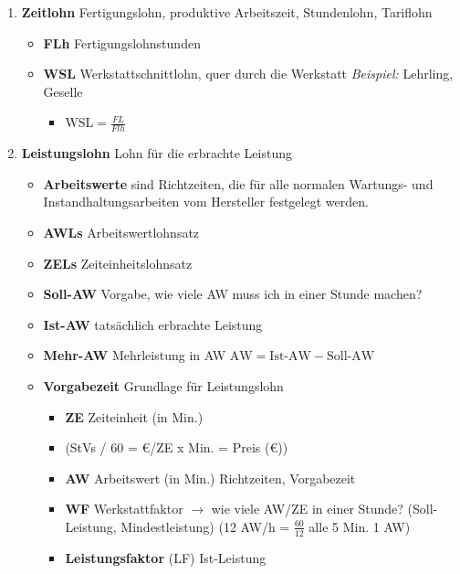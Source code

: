 \begin{enumerate}
\item
  \textbf{Zeitlohn} Fertigungslohn, produktive Arbeitszeit, Stundenlohn,
  Tariflohn

  \begin{itemize}
  \item
    \textbf{FLh} Fertigungslohnstunden
  \item
    \textbf{WSL} Werkstattschnittlohn, quer durch die Werkstatt
    \emph{Beispiel:} Lehrling, Geselle

    \begin{itemize}
    \item
      $\boxed{\text{WSL} = \frac{FL}{Flh}}$
    \end{itemize}
  \end{itemize}
\item
  \textbf{Leistungslohn} Lohn für die erbrachte Leistung

  \begin{itemize}
  \item
    \textbf{Arbeitswerte} sind Richtzeiten, die für alle normalen
    Wartungs- und Instandhaltungsarbeiten vom Hersteller festgelegt
    werden.
  \item
    \textbf{AWLs} Arbeitswertlohnsatz
  \item
    \textbf{ZELs} Zeiteinheitslohnsatz
  \item
    \textbf{Soll-AW} Vorgabe, wie viele AW muss ich in einer Stunde
    machen?
  \item
    \textbf{Ist-AW} tatsächlich erbrachte Leistung
  \item
    \textbf{Mehr-AW} Mehrleistung in AW
    $\boxed{\text{AW} = \text{Ist-AW} - \text{Soll-AW}}$
  \item
    \textbf{Vorgabezeit} Grundlage für Leistungslohn

    \begin{itemize}
    \item
      \textbf{ZE} Zeiteinheit (in Min.)
    \item
      (StVs / 60 = €/ZE x Min. = Preis (€))
    \item
      \textbf{AW} Arbeitswert (in Min.) Richtzeiten, Vorgabezeit
    \item
      \textbf{WF} Werkstattfaktor $\to$ wie viele AW/ZE in einer
      Stunde? (Soll-Leistung, Mindestleistung) (12 AW/h =
      $\frac{60}{12}$ alle 5 Min. 1 AW)
    \item
      \textbf{Leistungsfaktor} (LF) Ist-Leistung


\end{itemize}
\end{itemize}
\end{enumerate}
